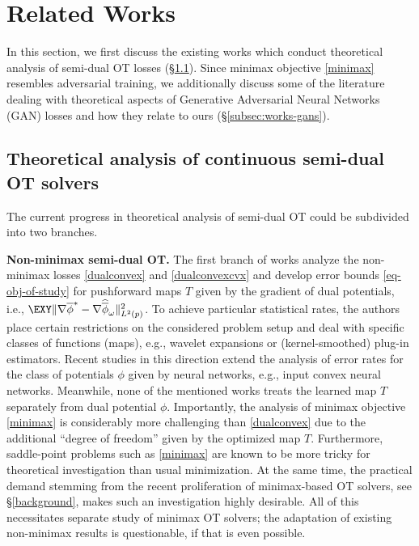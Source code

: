 \section{Related Works}
\label{sec:works}

In this section, we first discuss the existing works which conduct theoretical analysis of semi-dual OT losses (\S \ref{subsec:works-OT}). Since minimax objective \eqref{minimax} resembles adversarial training, we additionally discuss some of the literature dealing with theoretical aspects of Generative Adversarial Neural Networks (GAN) losses and how they relate to ours (\S \ref{subsec:works-gans}). 

\subsection{Theoretical analysis of continuous semi-dual OT solvers}\label{subsec:works-OT}

The current progress in theoretical analysis of semi-dual OT could be subdivided into two branches.

\textbf{Non-minimax semi-dual OT.} The first branch of works \cite{hutter2021minimax, gunsilius2022convergence} analyze the non-minimax losses \eqref{dualconvex} and \eqref{dualconvexcvx} and develop error bounds \eqref{eq-obj-of-study} for pushforward maps $T$ given by the gradient of dual potentials, i.e., $\EXY \Vert \nabla \overline{\phi}^* - \nabla \widehat{\overline{\phi}}_{\omega} \Vert^2_{L^2(p)}$. To achieve particular statistical rates, the authors place certain restrictions on the considered problem setup and deal with specific classes of functions (maps), e.g., wavelet expansions or (kernel-smoothed) plug-in estimators. Recent studies in this direction \cite{divol2022optimal, ding2024statistical} extend the analysis of error rates for the class of potentials $\phi$ given by neural networks, e.g., input convex neural networks. Meanwhile, none of the mentioned works treats the learned map $T$ separately from dual potential $\phi$. Importantly, the analysis of minimax objective \eqref{minimax} is considerably more challenging than \eqref{dualconvex} due to the additional ``degree of freedom'' given by the optimized map $T$. Furthermore, saddle-point problems such as \eqref{minimax} are known to be more tricky for theoretical investigation than usual minimization. At the same time, the practical demand stemming from the recent proliferation of minimax-based OT solvers, see \S \ref{background}, makes such an investigation highly desirable. All of this necessitates separate study of minimax OT solvers; the adaptation of existing non-minimax results is questionable, if that is even possible.

